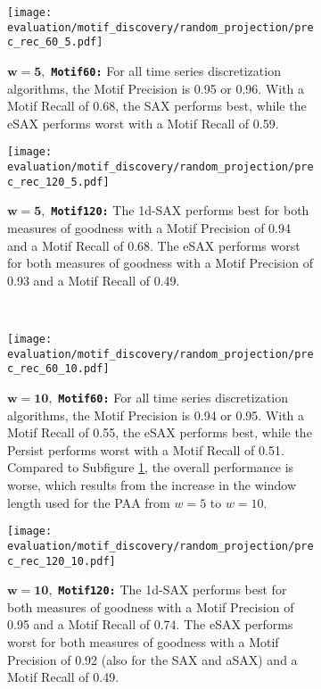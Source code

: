 \begin{figure}[H]
\centering
\begin{subfigure}[t]{0.45\textwidth}
\texttt{[image: evaluation/motif\_discovery/random\_projection/prec\_rec\_60\_5.pdf]}
\caption{$\mathbf{w = 5},$ \texttt{\textbf{Motif60:}} For all time series discretization algorithms, the Motif Precision is 0.95 or 0.96. With a Motif Recall of 0.68, the \ac{SAX} performs best, while the \ac{eSAX} performs worst with a Motif Recall of 0.59.}
\label{fig:rp_60_5}
\end{subfigure}
\hfill%
\begin{subfigure}[t]{0.45\textwidth}
\texttt{[image: evaluation/motif\_discovery/random\_projection/prec\_rec\_120\_5.pdf]}
\caption{$\mathbf{w = 5},$ \texttt{\textbf{Motif120:}} The \ac{1d-SAX} performs best for both measures of goodness with a Motif Precision of 0.94 and a Motif Recall of 0.68. The \ac{eSAX} performs worst for both measures of goodness with a Motif Precision of 0.93 and a Motif Recall of 0.49.}
\label{fig:rp_120_5}
\end{subfigure}
\\[10pt]
\begin{subfigure}[t]{0.45\textwidth}
\texttt{[image: evaluation/motif\_discovery/random\_projection/prec\_rec\_60\_10.pdf]}
\caption{$\mathbf{w = 10},$ \texttt{\textbf{Motif60:}} For all time series discretization algorithms, the Motif Precision is 0.94 or 0.95. With a Motif Recall of 0.55, the \ac{eSAX} performs best, while the Persist performs worst with a Motif Recall of 0.51. Compared to Subfigure \ref{fig:rp_60_5}, the overall performance is worse, which results from the increase in the window length used for the \ac{PAA} from $w = 5$ to $w = 10$.}
\label{fig:rp_60_10}
\end{subfigure}
\hfill%
\begin{subfigure}[t]{0.45\textwidth}
\texttt{[image: evaluation/motif\_discovery/random\_projection/prec\_rec\_120\_10.pdf]}
\caption{$\mathbf{w = 10},$ \texttt{\textbf{Motif120:}} The \ac{1d-SAX} performs best for both measures of goodness with a Motif Precision of 0.95 and a Motif Recall of 0.74. The \ac{eSAX} performs worst for both measures of goodness with a Motif Precision of 0.92 (also for the \ac{SAX} and \ac{aSAX}) and a Motif Recall of 0.49.}
\label{fig:rp_120_10}
\end{subfigure}
\\[10pt]
\begin{subfigure}[t]{0.5\textwidth}
\centering

\end{subfigure}
\end{figure}
